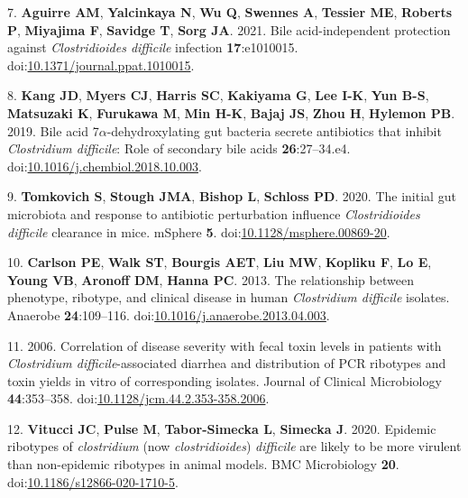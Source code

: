 \documentclass[
  12pt,
]{article}
\newenvironment{cslreferences}%
  {}%
  {\par}
\begin{document}
\begin{cslreferences}
\leavevmode\hypertarget{ref-Aguirre2021}{}%
7. \textbf{Aguirre AM}, \textbf{Yalcinkaya N}, \textbf{Wu Q},
\textbf{Swennes A}, \textbf{Tessier ME}, \textbf{Roberts P},
\textbf{Miyajima F}, \textbf{Savidge T}, \textbf{Sorg JA}. 2021. Bile
acid-independent protection against \emph{Clostridioides difficile}
infection \textbf{17}:e1010015.
doi:\href{https://doi.org/10.1371/journal.ppat.1010015}{10.1371/journal.ppat.1010015}.

\leavevmode\hypertarget{ref-Kang2019}{}%
8. \textbf{Kang JD}, \textbf{Myers CJ}, \textbf{Harris SC},
\textbf{Kakiyama G}, \textbf{Lee I-K}, \textbf{Yun B-S},
\textbf{Matsuzaki K}, \textbf{Furukawa M}, \textbf{Min H-K},
\textbf{Bajaj JS}, \textbf{Zhou H}, \textbf{Hylemon PB}. 2019. Bile acid
7\(\alpha\)-dehydroxylating gut bacteria secrete antibiotics that
inhibit \emph{Clostridium difficile}: Role of secondary bile acids
\textbf{26}:27--34.e4.
doi:\href{https://doi.org/10.1016/j.chembiol.2018.10.003}{10.1016/j.chembiol.2018.10.003}.

\leavevmode\hypertarget{ref-Tomkovich2020}{}%
9. \textbf{Tomkovich S}, \textbf{Stough JMA}, \textbf{Bishop L},
\textbf{Schloss PD}. 2020. The initial gut microbiota and response to
antibiotic perturbation influence \emph{Clostridioides difficile}
clearance in mice. mSphere \textbf{5}.
doi:\href{https://doi.org/10.1128/msphere.00869-20}{10.1128/msphere.00869-20}.

\leavevmode\hypertarget{ref-Carlson2013}{}%
10. \textbf{Carlson PE}, \textbf{Walk ST}, \textbf{Bourgis AET},
\textbf{Liu MW}, \textbf{Kopliku F}, \textbf{Lo E}, \textbf{Young VB},
\textbf{Aronoff DM}, \textbf{Hanna PC}. 2013. The relationship between
phenotype, ribotype, and clinical disease in human \emph{Clostridium
difficile} isolates. Anaerobe \textbf{24}:109--116.
doi:\href{https://doi.org/10.1016/j.anaerobe.2013.04.003}{10.1016/j.anaerobe.2013.04.003}.

\leavevmode\hypertarget{ref-Akerlund2006}{}%
11. 2006. Correlation of disease severity with fecal toxin levels in
patients with \emph{Clostridium difficile}-associated diarrhea and
distribution of PCR ribotypes and toxin yields in vitro of corresponding
isolates. Journal of Clinical Microbiology \textbf{44}:353--358.
doi:\href{https://doi.org/10.1128/jcm.44.2.353-358.2006}{10.1128/jcm.44.2.353-358.2006}.

\leavevmode\hypertarget{ref-Vitucci2020}{}%
12. \textbf{Vitucci JC}, \textbf{Pulse M}, \textbf{Tabor-Simecka L},
\textbf{Simecka J}. 2020. Epidemic ribotypes of \emph{clostridium} (now
\emph{clostridioides}) \emph{difficile} are likely to be more virulent
than non-epidemic ribotypes in animal models. BMC Microbiology
\textbf{20}.
doi:\href{https://doi.org/10.1186/s12866-020-1710-5}{10.1186/s12866-020-1710-5}.


\end{cslreferences}
\end{document}
